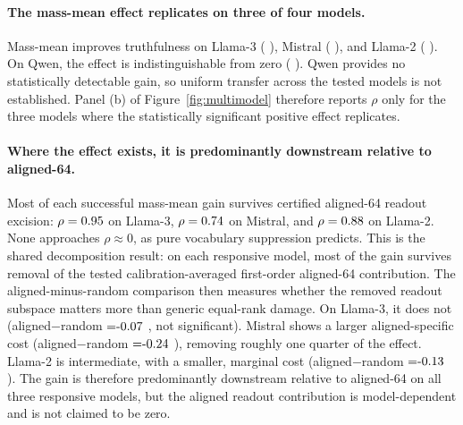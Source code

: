 \paragraph{The mass-mean effect replicates on three of four models.}
Mass-mean improves truthfulness on Llama-3 (\LlamaMmDelta{} \LlamaMmDeltaCI), Mistral (\MistralMmDelta{} \MistralMmDeltaCI), and Llama-2 (\LlamaTwoMmDelta{} \LlamaTwoMmDeltaCI). On Qwen, the effect is indistinguishable from zero (\QwenMmDelta{} \QwenMmDeltaCI). Qwen provides no statistically detectable gain, so uniform transfer across the tested models is not established. Panel (b) of Figure~\ref{fig:multimodel} therefore reports $\rho$ only for the three models where the statistically significant positive effect replicates.

\paragraph{Where the effect exists, it is predominantly downstream relative to aligned-64.}
Most of each successful mass-mean gain survives certified aligned-64 readout excision: $\rho = 0.95$ \LlamaMmRhoCI{} on Llama-3, $\rho = 0.74$ \MistralMmRhoCI{} on Mistral, and $\rho = 0.88$ \LlamaTwoMmRhoCI{} on Llama-2. None approaches $\rho \approx 0$, as pure vocabulary suppression predicts. This is the shared decomposition result: on each responsive model, most of the gain survives removal of the tested calibration-averaged first-order aligned-64 contribution. The aligned-minus-random comparison then measures whether the removed readout subspace matters more than generic equal-rank damage. On Llama-3, it does not (aligned$-$random $= \LlamaMmAmr$ \LlamaMmAmrCI, not significant). Mistral shows a larger aligned-specific cost (aligned$-$random $= \MistralMmAmr$ \MistralMmAmrCI), removing roughly one quarter of the effect. Llama-2 is intermediate, with a smaller, marginal cost (aligned$-$random $= \LlamaTwoMmAmr$ \LlamaTwoMmAmrCI). The gain is therefore predominantly downstream relative to aligned-64 on all three responsive models, but the aligned readout contribution is model-dependent and is not claimed to be zero.
